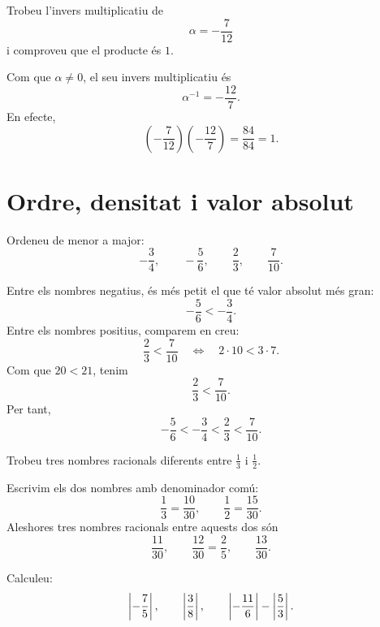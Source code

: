 \begin{exercici}
	Trobeu l'invers multiplicatiu de
	\[
		\alpha=-\frac{7}{12}
	\]
	i comproveu que el producte és \(1\).
\end{exercici}

\begin{solucio}
	Com que \(\alpha\neq0\), el seu invers multiplicatiu és
	\[
		\alpha^{-1}=-\frac{12}{7}.
	\]
	En efecte,
	\[
		\left(-\frac{7}{12}\right)\left(-\frac{12}{7}\right)=\frac{84}{84}=1.
	\]
\end{solucio}

\section{Ordre, densitat i valor absolut}

\begin{exercici}[Ordre en \(\Q\)]
	Ordeneu de menor a major:
	\[
		-\frac{3}{4},
		\qquad
		-\frac{5}{6},
		\qquad
		\frac{2}{3},
		\qquad
		\frac{7}{10}.
	\]
\end{exercici}

\begin{solucio}
	Entre els nombres negatius, és més petit el que té valor absolut més gran:
	\[
		-\frac{5}{6}< -\frac{3}{4}.
	\]
	Entre els nombres positius, comparem en creu:
	\[
		\frac{2}{3}<\frac{7}{10}
		\quad\Longleftrightarrow\quad
		2\cdot10<3\cdot7.
	\]
	Com que \(20<21\), tenim
	\[
		\frac{2}{3}<\frac{7}{10}.
	\]
	Per tant,
	\[
		-\frac{5}{6}< -\frac{3}{4}<\frac{2}{3}<\frac{7}{10}.
	\]
\end{solucio}

\begin{exercici}[Densitat]
	Trobeu tres nombres racionals diferents entre \(\frac{1}{3}\) i \(\frac{1}{2}\).
\end{exercici}

\begin{solucio}
	Escrivim els dos nombres amb denominador comú:
	\[
		\frac{1}{3}=\frac{10}{30},
		\qquad
		\frac{1}{2}=\frac{15}{30}.
	\]
	Aleshores tres nombres racionals entre aquests dos són
	\[
		\frac{11}{30},
		\qquad
		\frac{12}{30}=\frac{2}{5},
		\qquad
		\frac{13}{30}.
	\]
\end{solucio}

\begin{exercici}
	Calculeu:
	\[
		\left\lvert -\frac{7}{5}\right\rvert,
		\qquad
		\left\lvert \frac{3}{8}\right\rvert,
		\qquad
		\left\lvert -\frac{11}{6}\right\rvert-\left\lvert \frac{5}{3}\right\rvert.
	\]
\end{exercici}


